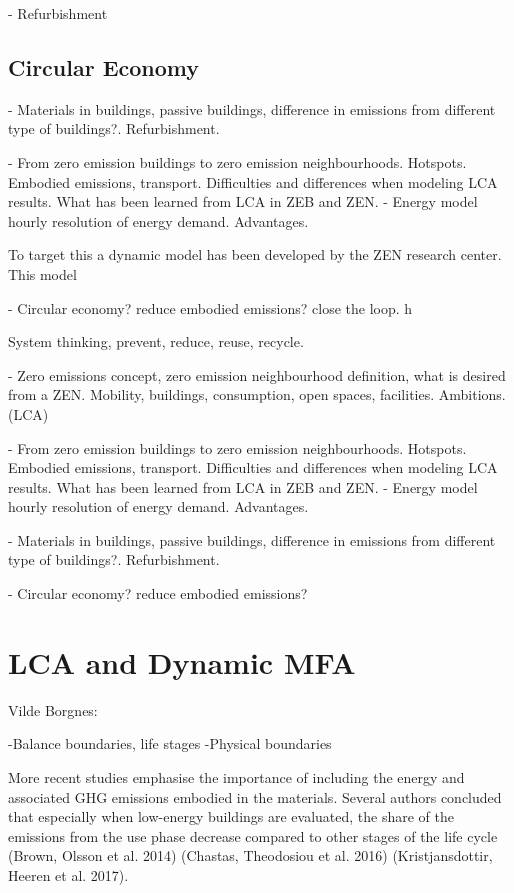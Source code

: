 - Refurbishment

\subsection{Circular Economy}


- Materials in buildings, passive buildings, difference in emissions from different type of buildings?. Refurbishment. 

	

- From zero emission buildings to zero emission neighbourhoods.
 Hotspots. Embodied emissions, transport. Difficulties and differences when modeling 
LCA results. What has been learned from LCA in ZEB and ZEN. 
		- Energy model hourly resolution of energy demand. Advantages. 

		To target this a dynamic model has been developed by the ZEN research center. This model 


- Circular economy? reduce embodied emissions? close the loop. h
	
	System thinking, prevent, reduce, reuse, recycle. 








- Zero emissions concept, zero emission neighbourhood definition, what is desired from a ZEN. 
Mobility, buildings, consumption, open spaces, facilities. 
Ambitions. (LCA) 

- From zero emission buildings to zero emission neighbourhoods.
 Hotspots. Embodied emissions, transport. Difficulties and differences when modeling 
LCA results. What has been learned from LCA in ZEB and ZEN. 
		- Energy model hourly resolution of energy demand. Advantages. 

- Materials in buildings, passive buildings, difference in emissions from different type of buildings?. Refurbishment. 

- Circular economy? reduce embodied emissions? 
 


\section{LCA and Dynamic MFA} %


Vilde Borgnes: 

-Balance boundaries, life stages
-Physical boundaries

More recent studies emphasise the importance of including the energy and associated GHG emissions embodied in the materials. Several authors concluded that especially when low-energy buildings are evaluated, the share of the emissions from the use phase decrease compared to other stages of the life cycle (Brown, Olsson et al. 2014) (Chastas, Theodosiou et al. 2016) (Kristjansdottir, Heeren et al. 2017).


